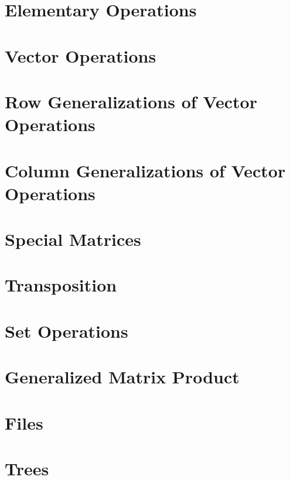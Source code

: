 \section{Elementary Operations}


\section{Vector Operations}


\section{Row Generalizations of Vector Operations}


\section{Column Generalizations of Vector Operations}


\section{Special Matrices}


\section{Transposition}


\section{Set Operations}


\section{Generalized Matrix Product}


\section{Files}


\section{Trees}

